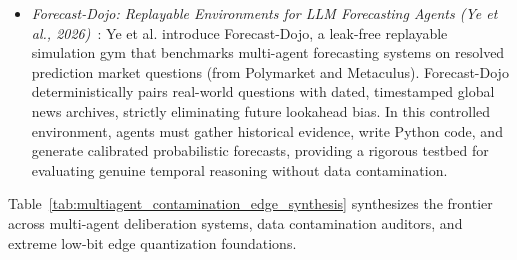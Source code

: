 \begin{itemize}[leftmargin=*]
    \item \emph{Forecast-Dojo: Replayable Environments for LLM Forecasting Agents (Ye et al., 2026)}~\cite{ye2026forecastdojo}: Ye et al. introduce Forecast-Dojo, a leak-free replayable simulation gym that benchmarks multi-agent forecasting systems on resolved prediction market questions (from Polymarket and Metaculus). Forecast-Dojo deterministically pairs real-world questions with dated, timestamped global news archives, strictly eliminating future lookahead bias. In this controlled environment, agents must gather historical evidence, write Python code, and generate calibrated probabilistic forecasts, providing a rigorous testbed for evaluating genuine temporal reasoning without data contamination.
\end{itemize}

Table~\ref{tab:multiagent_contamination_edge_synthesis} synthesizes the frontier across multi-agent deliberation systems, data contamination auditors, and extreme low-bit edge quantization foundations.

